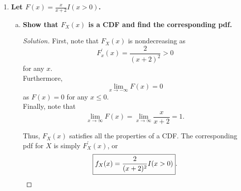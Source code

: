 \documentclass[11pt]{article}
\newenvironment{solution}
  {\renewcommand\qedsymbol{$\blacksquare$}\begin{proof}[Solution]}
  {\end{proof}}
\begin{document}
\begin{enumerate}
\begin{enumerate}[a)]
\begin{solution}
        Thus, the pdf for $Y$ is 
        \[
            \boxed{f_Y(y) = \frac{\left( \frac{\alpha}{\mu} \right)^{\alpha} }{\Gamma(\alpha)} y^{-\alpha - 1} e^{- \frac{\alpha}{\mu y} }}.
        \]

        To identify the mode of $y$, we can once again work to maximize the log of the pdf for $Y$, denoted $\ell(y)$ for convenience. Note that
        \[
            \ell(y) = \ln \left( \frac{\left( \frac{\alpha}{\mu} \right)^{\alpha} }{\Gamma(\alpha)} \right) + (-\alpha - 1) \ln(y) - \frac{\alpha}{\mu y}.
        \]

        Taking the derivative of $\ell(y)$, we find
        \[
            \ell^{\prime}(y) = \frac{-\alpha - 1}{y} + \frac{\alpha}{\mu y^2}.
        \]

        The mode occurs when $\ell^{\prime}(y) = 0$, or when $\frac{\alpha + 1}{y} = \frac{\alpha}{\mu y^2}$. Solving for $y$, we find that the mode is at
        \[
            \boxed{y = \frac{\alpha}{\mu(\alpha + 1)}}
        \]
        for all $\alpha > 0$.
        \end{solution}
    \end{enumerate}

\newpage

    \item \textbf{Let $F(x) = \frac{x}{x+2} I(x > 0)$.}
    
    \begin{enumerate}[a)]
        \item \textbf{Show that $F_X(x)$ is a CDF and find the corresponding pdf.}
        
        \begin{solution}
        First, note that $F_X(x)$ is nondecreasing as 
        \[
            F^{\prime}_x(x) = \frac{2}{(x+2)^2} > 0
        \] 
        for any $x$. \\

        Furthermore,
        \[
            \lim_{x \to -\infty} F(x) = 0
        \]
        as $F(x) = 0$ for any $x \leq 0$. \\
        
        Finally, note that  
        \[
            \lim_{x \to \infty} F(x) = \lim_{x \to \infty} \frac{x}{x+2} = 1.
        \]

        Thus, $F_X(x)$ satisfies all the properties of a CDF. The corresponding pdf for $X$ is simply $F^{\prime}_X(x)$, or
        \[
            \boxed{f_X(x) = \frac{2}{(x+2)^2} I(x > 0)}. \qedhere
        \]
        \end{solution}


\end{enumerate}
\end{enumerate}
\end{document}
